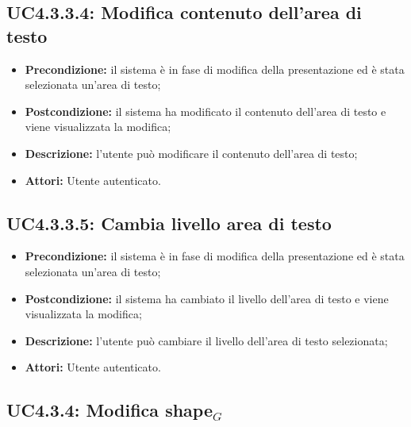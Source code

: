 \subsection{ UC4.3.3.4: Modifica contenuto dell'area di testo}

\begin{itemize}
	\item \textbf{Precondizione:} il sistema è in fase di modifica della presentazione ed è stata selezionata un'area di testo;
	\item \textbf{Postcondizione:} il sistema ha modificato il contenuto dell'area di testo e viene visualizzata la modifica;
	\item \textbf{Descrizione:} l'utente può modificare il contenuto dell'area di testo;
	\item \textbf{Attori:} Utente autenticato.
\end{itemize}
\subsection{ UC4.3.3.5: Cambia livello area di testo}

\begin{itemize}
	\item \textbf{Precondizione:} il sistema è in fase di modifica della presentazione ed è stata selezionata un'area di testo;
	\item \textbf{Postcondizione:} il sistema ha cambiato il livello dell'area di testo e viene visualizzata la modifica;
	\item \textbf{Descrizione:} l'utente può cambiare il livello dell'area di testo selezionata;
	\item \textbf{Attori:} Utente autenticato.
\end{itemize}
\subsection{ UC4.3.4: Modifica shape$_G$}

